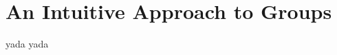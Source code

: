 \chapter{An Intuitive Approach to Groups}
\label{chapter:intuitive_approach_groups}
\thispagestyle{empty}

yada yada